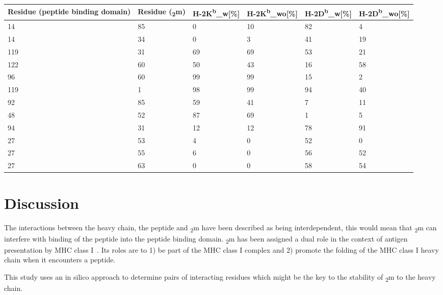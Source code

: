 \documentclass[11pt,twocolumn]{article}
\newcommand{\db}{H-2D\textsuperscript{b}\xspace}
\newcommand{\dbw}{H-2D\textsuperscript{b}\_w\xspace}
\newcommand{\dbwo}{H-2D\textsuperscript{b}\_wo\xspace}
\newcommand{\kb}{H-2K\textsuperscript{b}\xspace}
\newcommand{\kbw}{H-2K\textsuperscript{b}\_w\xspace}
\newcommand{\kbwo}{H-2K\textsuperscript{b}\_wo\xspace}
\newcommand{\angstr}{{\AA}ngstroms\xspace}
\newcommand{\btm}{\textbeta\textsubscript{2}m\xspace}
\begin{document}
\begin{table*}
\caption{\textbf{ Compilation of the the interacting residues used for the analysis of \kb and \db, and the percentage of interactions bellow below four \angstr, of each analysed condition.} The residues interacting coming from the peptide binding domain, the residues interacting coming from \btm and the percentage of their interaction which is below four \angstr is analysed in \db and \kb for the condition of with peptide and without peptide}
\label{KBDBinteractions}
\begin{tabularx}{\linewidth}{|X|X|X|X|X|X|}  \hline
Residue (peptide binding domain)&Residue (\btm)&\kbw [\%]&\kbwo [\%]&\dbw [\%]&\dbwo [\%]\\ \hline
14&85&0&10&82&4\\ \hline
14&34&0&3&41&19\\ \hline
119&31&69&69&53&21\\ \hline
122&60&50&43&16&58\\ \hline
96&60&99&99&15&2\\ \hline
119&1&98&99&94&40\\ \hline
92&85&59&41&7&11\\ \hline
48&52&87&69&1&5\\ \hline
94&31&12&12&78&91\\ \hline
27&53&4&0&52&0\\ \hline
27&55&6&0&56&52\\ \hline
27&63&0&0&58&54\\ \hline
\end{tabularx}
\end{table*}









\section*{Discussion}
The interactions between the heavy chain, the peptide and \btm have been described  as being interdependent, this would mean that \btm can interfere with binding of the peptide into the peptide binding domain. 
\btm has been assigned a dual role in the context of antigen presentation by MHC class I~\cite{achour2006structural}. Its roles are to 1) be part of the MHC class I complex and 2) promote the folding of the MHC class I heavy chain when it encounters a peptide.


This study uses an in silico approach to determine pairs of interacting residues which might be the key to the stability of \btm to the heavy chain. 
\end{document}
